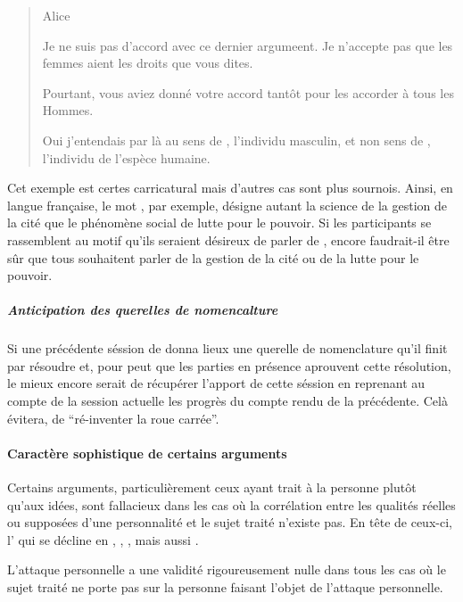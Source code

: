 \begin{quote}
  \begin{drama}{0cm}{0cm}{Alice}

    \Aspeaks Je ne suis pas d’accord avec ce dernier argumeent. Je n’accepte pas que les femmes aient les droits que vous dites.

    \Bspeaks Pourtant, vous aviez donné votre accord tantôt pour les accorder à tous les Hommes.

    \Aspeaks Oui j’entendais par là  au sens de , l’individu masculin, et non  sens de , l’individu de l’espèce humaine.

  \end{drama}
\end{quote}

Cet exemple est certes carricatural mais d’autres cas sont plus sournois. Ainsi, en langue française, le mot , par exemple, désigne autant la science de la gestion de la cité que le phénomène social de lutte pour le pouvoir. Si les participants se rassemblent au motif qu’ils seraient désireux de parler de , encore faudrait-il être sûr que tous souhaitent parler de la gestion de la cité ou de la lutte pour le pouvoir.

\subparagraph{Anticipation des querelles de nomencalture}
Si une précédente séssion de \mainabbr{} donna lieux une querelle de nomenclature qu’il finit par résoudre et, pour peut que les parties en présence aprouvent cette résolution, le mieux encore serait de récupérer l’apport de cette séssion en reprenant au compte de la session actuelle les progrès du compte rendu de la précédente. Celà évitera, de \enquote{ré-inventer la roue carrée}.

\paragraph{Caractère sophistique de certains arguments}
Certains arguments, particulièrement ceux ayant trait à la personne plutôt qu’aux idées, sont fallacieux dans les cas où la corrélation entre les qualités réelles ou supposées d’une personnalité et le sujet traité n’existe pas. En tête de ceux-ci, l’ qui se décline en , , , mais aussi .

L’attaque personnelle a une validité rigoureusement nulle dans tous les cas où le sujet traité ne porte pas sur la personne faisant l’objet de l’attaque personnelle.

